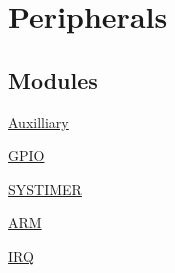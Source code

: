 \hypertarget{group__Peripherals}{}\section{Peripherals}
\label{group__Peripherals}
\subsection*{Modules}
\begin{DoxyCompactItemize}
\item 
\hyperlink{group__Auxilliary}{Auxilliary}
\item 
\hyperlink{group__GPIO}{G\+P\+IO}
\item 
\hyperlink{group__SYSTIMER}{S\+Y\+S\+T\+I\+M\+ER}
\item 
\hyperlink{group__ARM}{A\+RM}
\item 
\hyperlink{group__IRQ}{I\+RQ}
\end{DoxyCompactItemize}
